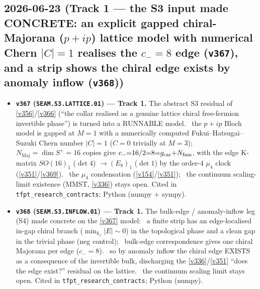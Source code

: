 \subsection*{2026-06-23 (Track 1 --- the S3 input made CONCRETE: an explicit gapped chiral-Majorana ($p{+}ip$) lattice model with numerical Chern $|C|{=}1$ realises the $c_-{=}8$ edge (\texttt{v367}), and a strip shows the chiral edge exists by anomaly inflow (\texttt{v368}))}
\begin{itemize}
\item \textbf{\texttt{v367} (\texttt{SEAM.S3.LATTICE.01}) --- Track 1.} The abstract S3 residual of
\vref{v356}/\vref{v366} (``the collar realised as a genuine lattice chiral free-fermion invertible phase'')
is turned into a RUNNABLE model. \mE\ the $p{+}ip$ Bloch model is gapped at $M{=}1$ with a numerically
computed Fukui--Hatsugai--Suzuki Chern number $|C|{=}1$ ($C{=}0$ trivially at $M{=}3$); \mE\
$N_{\mathrm{Maj}}{=}\dim S^+{=}16$ copies give $c_-{=}16/2{=}8{=}g_{\mathrm{car}}{+}N_{\mathrm{fam}}$, with the edge K-matrix
$SO(16)_1$ ($\det 4$) $\to(E_8)_1$ ($\det 1$) by the order-4 $\mu_4$ clock (\vref{v351}/\vref{v369}). \mC\ the
$\mu_4$ condensation (\vref{v154}/\vref{v351}); \mO\ the continuum scaling-limit existence (MMST, \vref{v336})
stays open. Cited in \texttt{tfpt\_research\_contracts}; Python (numpy + sympy).
\item \textbf{\texttt{v368} (\texttt{SEAM.S3.INFLOW.01}) --- Track 1.} The bulk-edge / anomaly-inflow leg (S4)
made concrete on the \vref{v367} model: \mE\ a finite strip has an edge-localised in-gap chiral branch
($\min_{k_x}|E|\sim0$) in the topological phase and a clean gap in the trivial phase (neg control); \mE\
bulk-edge correspondence gives one chiral Majorana per edge ($c_-{=}8$). \mC\ so by anomaly inflow the chiral
edge EXISTS as a consequence of the invertible bulk, discharging the \vref{v336}/\vref{v351} ``does the edge
exist?'' residual on the lattice. \mO\ the continuum scaling limit stays open. Cited in
\texttt{tfpt\_research\_contracts}; Python (numpy).
\end{itemize}

